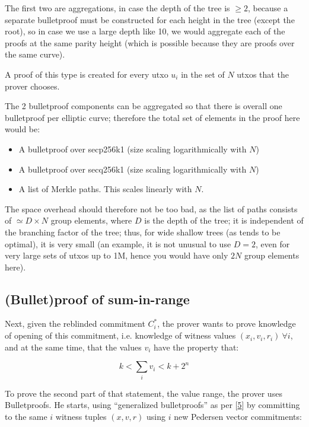 \documentclass[10pt,a4paper]{article}
\begin{document}
The first two are aggregations, in case the depth of the tree is $\ge 2$, because a separate bulletproof must be constructed for each height in the tree (except the root), so in case we use a large depth like 10, we would aggregate each of the proofs at the same parity height (which is possible because they are proofs over the same curve).

A proof of this type is created for every utxo $u_{i}$ in the set of $N$ utxos that the prover chooses.

The 2 bulletproof components can be aggregated so that there is overall one bulletproof per elliptic curve; therefore the total set of elements in the proof here would be:

\begin{itemize}
\item A bulletproof over secp256k1 (size scaling logarithmically with $N$)
\item A bulletproof over secq256k1 (size scaling logarithmically with $N$)
\item A list of Merkle paths. This scales linearly with $N$.
\end{itemize}

The space overhead should therefore not be too bad, as the list of paths consists of $\simeq D \times N$ group elements, where $D$ is the depth of the tree; it is independent of the branching factor of the tree; thus, for wide shallow trees (as tends to be optimal), it is very small (an example, it is not unusual to use $D=2$, even for very large sets of utxos up to 1M, hence you would have only $2N$ group elements here).

\subsection{(Bullet)proof of sum-in-range}

Next, given the reblinded commitment $C_{i}^*$, the prover wants to prove knowledge of opening of this commitment, i.e. knowledge of witness values $(x_i, v_i, r_i) \ \forall i$, and at the same time, that the values $v_i$ have the property that:

$$k < \sum_i v_i < k + 2^n$$

To prove the second part of that statement, the value range, the prover uses Bulletproofs. He starts, using ``generalized bulletproofs'' as per {[}\protect\hyperlink{anchor-5}{5}{]} by committing to the same $i$ witness tuples $(x, v, r)$ using $i$ new Pedersen vector commitments:
\end{document}
